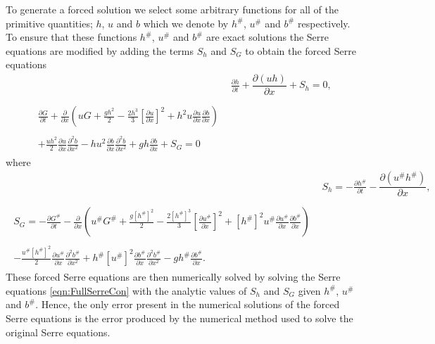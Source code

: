 \documentclass[times]{elsarticle}
\begin{document}
To generate a forced solution we select some arbitrary functions for all of the primitive quantities; $h$, $u$ and $b$ which we denote by $h^\#$, $u^\#$ and $b^\#$ respectively. To ensure that these functions $h^\#$, $u^\#$ and $b^\#$ are exact solutions the Serre equations are modified by adding the terms $S_{h} $ and $S_{G}$ to obtain the forced Serre equations
\begin{align*}
& \frac{\partial h}{\partial t} + \dfrac{\partial (uh)}{\partial x} + S_{h}  = 0 ,  \\ \nonumber \\
\begin{split}
\frac{\partial G}{\partial t}  + \frac{\partial}{\partial x} \left( {u} G + \frac{gh^2}{2} - \frac{2h^3}{3} \left[ \frac{\partial {u}}{\partial x} \right]^2 + h^2 {u}\frac{\partial {u}}{\partial x}\frac{\partial b}{\partial x} \right) \\ \\ + \frac{uh^2 }{2}\frac{\partial {u}}{\partial x} \frac{\partial^2 b}{\partial x^2}  - h {u}^2\frac{\partial b}{\partial x}\frac{\partial^2 b}{\partial x^2} + gh\frac{\partial b}{\partial x} + S_{G} = 0
\end{split}
\end{align*}
where
\begin{align*}
&  S_{h} = -\frac{\partial h^\#}{\partial t} - \dfrac{\partial (u^\#h^\#)}{\partial x} ,  \\ \nonumber \\
\begin{split}
S_{G} = -\frac{\partial G^\#}{\partial t}  - \frac{\partial}{\partial x} \left( {u}^\# G^\# + \frac{g\left[h^\#\right]^2}{2} - \frac{2\left[h^\#\right]^3}{3} \left[\frac{\partial {u}^\#}{\partial x}\right]^2 + \left[h^\#\right]^2 {u^\#}\frac{\partial {u}^\#}{\partial x}\frac{\partial b^\#}{\partial x} \right) \\ \\ - \frac{{u}^\#\left[h^\#\right]^2 }{2} \frac{\partial {u}^\#}{\partial x} \frac{\partial^2 b^\#}{\partial x^2}  + h^\# {\left[u^\#\right]}^2\frac{\partial b^\#}{\partial x}\frac{\partial^2 b^\#}{\partial x^2} - gh^\#\frac{\partial b^\#}{\partial x}.
\end{split}
\end{align*} 
These forced Serre equations are then numerically solved by solving the Serre equations \eqref{eqn:FullSerreCon} with the analytic values of $S_{h}$ and $S_{G}$ given $h^\#$, $u^\#$ and $b^\#$. Hence, the only error present in the numerical solutions of the forced Serre equations is the error produced by the numerical method used to solve the original Serre equations.
\end{document}
